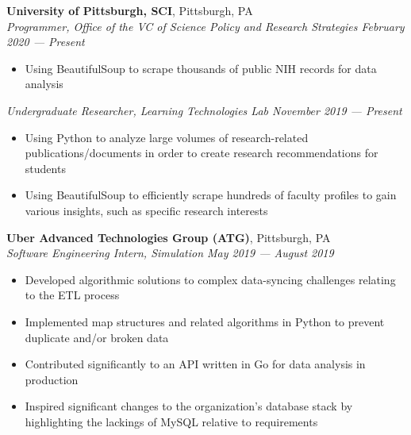 \documentclass[11pt]{article}
\begin{document}
\begin{flushleft}
		\vspace{2.25mm}
		\textbf{University of Pittsburgh, SCI}, Pittsburgh, PA\\
		\textit{\small Programmer, Office of the VC of Science Policy and Research Strategies \hfill February 2020 --- Present}
		\vspace{-1.25mm}
		\begin{itemize}
				\item Using BeautifulSoup to scrape thousands of public NIH records for data analysis
		\end{itemize}
		\vspace{-1.25mm}
		\textit{\small Undergraduate Researcher, Learning Technologies Lab \hfill November 2019 --- Present}
		\vspace{-1.25mm}
		\begin{itemize}
				\item Using Python to analyze large volumes of research-related publications/documents in order to create research recommendations for students
				\vspace{-1.5mm}
				\item Using BeautifulSoup to efficiently scrape hundreds of faculty profiles to gain various insights, such as specific research interests
		\end{itemize}

		\textbf{Uber Advanced Technologies Group (ATG)}, Pittsburgh, PA\\
		\textit{\small Software Engineering Intern, Simulation \hfill May 2019 --- August 2019}
		\vspace{-1.25mm}
		\begin{itemize}
			\item Developed algorithmic solutions to complex data-syncing challenges relating to the ETL process
			\vspace{-1.5mm}
			\item Implemented map structures and related algorithms in Python to prevent duplicate and/or broken data
			\vspace{-1.5mm}
			\item Contributed significantly to an API written in Go for data analysis in production
			\vspace{-1.5mm}
			\item Inspired significant changes to the organization's database stack by highlighting the lackings of MySQL relative to requirements
		\end{itemize}
	

\end{flushleft}
\end{document}
